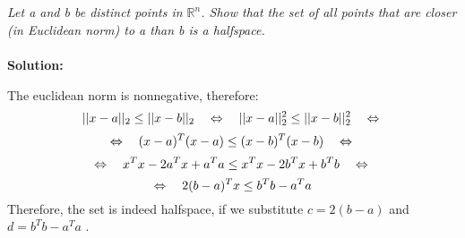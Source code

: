 \documentclass[10pt]{article}
\newcommand{\R}{\mathbb{R}}
\begin{document}
  	\begin{center}
  	\section{}
  	\end{center}\par
  	\textit{Let a and b be distinct points in $\R^n$. Show that the set of all points that are closer (in
Euclidean norm) to a than b is a halfspace.}\\ \\
  	\textbf{Solution: }\\ \par
  	The euclidean norm is nonnegative, therefore:  \\
  	$$||x-a||_2 \leq ||x-b||_2 \quad \Leftrightarrow \quad ||x-a||_2^2 \leq ||x-b||_2^2 \quad \Leftrightarrow \\$$
  	$$\Leftrightarrow \quad (x-a)^T(x-a) \leq (x-b)^T(x-b) \quad  \Leftrightarrow \\$$
 $$ 	\Leftrightarrow \quad x^Tx - 2a^Tx + a^Ta \leq x^Tx - 2b^Tx + b^Tb \quad \Leftrightarrow \\$$
  $$	\Leftrightarrow \quad 2(b-a)^Tx \leq b^Tb - a^Ta \\ $$
  	Therefore, the set is indeed halfspace, if we substitute $ c = 2(b-a)$ and $ d = b^Tb - a^Ta$ .
  	\newpage
  	
\end{document}
